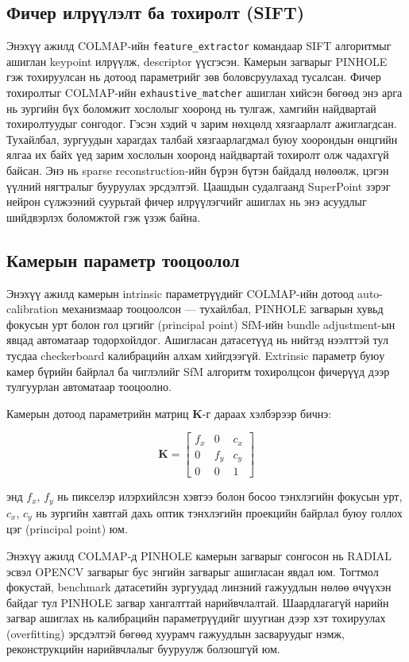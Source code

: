 \subsection{Фичер илрүүлэлт ба тохиролт (SIFT)}
Энэхүү ажилд COLMAP-ийн \texttt{feature\_extractor} командаар SIFT алгоритмыг 
ашиглан keypoint илрүүлж, descriptor үүсгэсэн. Камерын загварыг PINHOLE гэж 
тохируулсан нь дотоод параметрийг зөв боловсруулахад тусалсан.
Фичер тохиролтыг COLMAP-ийн \texttt{exhaustive\_matcher} ашиглан хийсэн бөгөөд энэ 
арга нь зургийн бүх боломжит хослолыг хооронд нь тулгаж, хамгийн найдвартай 
тохиролтуудыг сонгодог. Гэсэн хэдий ч зарим нөхцөлд хязгаарлалт ажиглагдсан.
Тухайлбал, зургуудын харагдах талбай хязгаарлагдмал буюу хоорондын өнцгийн
ялгаа их байх үед зарим хослолын хооронд найдвартай тохиролт олж чадахгүй байсан.
Энэ нь sparse reconstruction-ийн бүрэн бүтэн байдалд нөлөөлж, цэгэн үүлний
нягтралыг бууруулах эрсдэлтэй. Цаашдын судалгаанд SuperPoint зэрэг нейрон 
сүлжээний суурьтай фичер илрүүлэгчийг ашиглах нь энэ асуудлыг шийдвэрлэх 
боломжтой гэж үзэж байна.

\subsection{Камерын параметр тооцоолол}
Энэхүү ажилд камерын intrinsic параметрүүдийг COLMAP-ийн дотоод auto-calibration механизмаар тооцоолсон — тухайлбал, PINHOLE загварын хувьд фокусын урт болон гол цэгийг (principal point) SfM-ийн bundle adjustment-ын явцад автоматаар тодорхойлдог. Ашигласан датасетүүд нь нийтэд нээлттэй тул тусдаа checkerboard калибрацийн алхам хийгдээгүй. Extrinsic параметр буюу камер бүрийн байрлал ба чиглэлийг SfM алгоритм тохиролцсон фичерүүд дээр тулгуурлан автоматаар тооцоолно.

Камерын дотоод параметрийн матриц $\mathbf{K}$-г дараах хэлбэрээр бичнэ:

\begin{equation}
\mathbf{K} = \begin{bmatrix} f_x & 0 & c_x \\ 0 & f_y & c_y \\ 0 & 0 & 1 \end{bmatrix}
\label{eq:intrinsic}
\end{equation}

энд $f_x$, $f_y$ нь пикселэр илэрхийлсэн хэвтээ болон босоо тэнхлэгийн фокусын урт, $c_x$, $c_y$ нь зургийн хавтгай дахь оптик тэнхлэгийн проекцийн байрлал буюу голлох цэг (principal point) юм.

Энэхүү ажилд COLMAP-д PINHOLE камерын загварыг сонгосон нь RADIAL эсвэл OPENCV загварыг бус энгийн загварыг ашигласан явдал юм. Тогтмол фокустай, benchmark датасетийн зургуудад линзний гажуудлын нөлөө өчүүхэн байдаг тул PINHOLE загвар хангалттай нарийвчлалтай. Шаардлагагүй нарийн загвар ашиглах нь калибрацийн параметрүүдийг шуугиан дээр хэт тохируулах (overfitting) эрсдэлтэй бөгөөд хуурамч гажуудлын засваруудыг нэмж, реконструкцийн нарийвчлалыг бууруулж болзошгүй юм.

